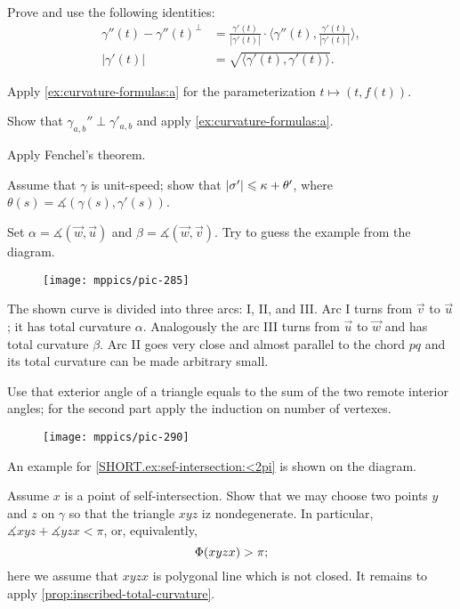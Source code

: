  Prove and use the following identities: 
\begin{align*}
\gamma''(t)-\gamma''(t)^\perp&=\tfrac{\gamma'(t)}{|\gamma'(t)|}\cdot\langle\gamma''(t),\tfrac{\gamma'(t)}{|\gamma'(t)|}\rangle,
\\
|\gamma'(t)|&=\sqrt{\langle \gamma'(t),\gamma'(t)\rangle}.\
\end{align*}

Apply \ref{ex:curvature-formulas:a} for the parameterization $t\mapsto (t,f(t))$.

Show that $\gamma_{a,b}''\perp \gamma'_{a,b}$ and apply \ref{ex:curvature-formulas:a}.

 Apply Fenchel's theorem.

 Assume that $\gamma$ is unit-speed; show that $|\sigma'|\leqslant \kappa+\theta'$, where $\theta(s)=\measuredangle(\gamma(s),\gamma'(s))$.

Set $\alpha=\measuredangle(\vec w,\vec u)$ and $\beta=\measuredangle(\vec w,\vec v)$.
Try to guess the example from the diagram.
\begin{figure}[h!]
\vskip-0mm
\centering
\texttt{[image: mppics/pic-285]}
\vskip0mm
\end{figure}

The shown curve is divided into three arcs: I, II, and III. 
Arc I turns from $\vec v$ to $\vec u$;
it has total curvature $\alpha$.
Analogously the arc III turns from $\vec u$ to $\vec w$  and has total curvature $\beta$. 
Arc II goes very close and almost parallel to the chord $pq$ and its total curvature can be made arbitrary small.


Use that exterior angle of a triangle equals to the sum of the two remote interior angles;
for the second part apply the induction on number of vertexes.

\begin{wrapfigure}{r}{23 mm}
\vskip-0mm
\centering
\texttt{[image: mppics/pic-290]}
\vskip-4mm
\end{wrapfigure}

 An example for \ref{SHORT.ex:sef-intersection:<2pi} is shown on the diagram. 

 Assume $x$ is a point of self-intersection.
Show that we may choose two points $y$ and $z$ on $\gamma$ so that the triangle $xyz$ iz nondegenerate.
In particular, $\measuredangle xyz+\measuredangle yzx<\pi$, or, equivalently, 
\[\Phi({xyzx})>\pi;\]
here we assume that $xyzx$ is polygonal line which is not closed. 
It remains to apply \ref{prop:inscribed-total-curvature}.

